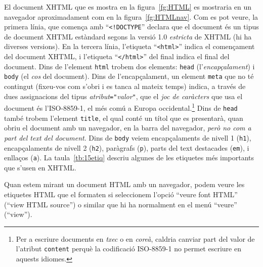 El document XHTML que es mostra en la figura~\ref{fg:HTML} es
mostraria en un navegador aproximadament com en la
figura~\ref{fg:HTMLnav}. Com es pot veure, la primera línia, que
comença amb ``\texttt{<!DOCTYPE}'' declara que el document és un tipus
de document XHTML estàndard segons la versió 1.0 \emph{estricta} de
XHTML (hi ha diverses versions).  En la tercera línia, l'etiqueta
``\texttt{<html>}'' indica el començament del document XHTML, i
l'etiqueta ``\texttt{</html>}'' del final indica el final del
document. Dins de l'element \texttt{html} trobem dos elements:
\texttt{head} (l'\emph{encapçalament}) i \texttt{body} (el \emph{cos}
del document).  Dins de l'encapçalament, un element \texttt{meta} que
no té contingut (fixeu-vos com s'obri i es tanca al mateix temps)
indica, a través de dues assignacions del tipus
\emph{atribut}\texttt{="}\emph{valor}\texttt{"}, que el \emph{joc de
  caràcters} que usa el document és l'ISO-8859-1, el més comú a Europa
occidental.\footnote{Per a escriure documents en \emph{txec} o en
  \emph{coreà}, caldria canviar part del valor de l'atribut
  \texttt{content} perquè la codificació ISO-8859-1 no permet escriure
  en aquests idiomes.} Dins de \texttt{head} també trobem l'element
\texttt{title}, el qual conté un títol que es presentarà, quan obriu
el document amb un navegador, en la barra del navegador, \emph{però no
  com a part del text del document}. Dins de \texttt{body} veiem
encapçalaments de nivell 1 (\texttt{h1}), encapçalaments de nivell 2
(\texttt{h2}), paràgrafs (\texttt{p}), parts del text destacades
(\texttt{em}), i enllaços (\texttt{a}). La taula~\ref{tb:15etiq}
descriu algunes de les etiquetes més importants que s'usen en XHTML.

Quan estem mirant un document HTML amb un navegador, podem veure les
etiquetes HTML que el formaten si seleccionem l'opció ``veure font
HTML'' (``view HTML source'') o similar que hi ha normalment en el
menú ``veure'' (``view'').

